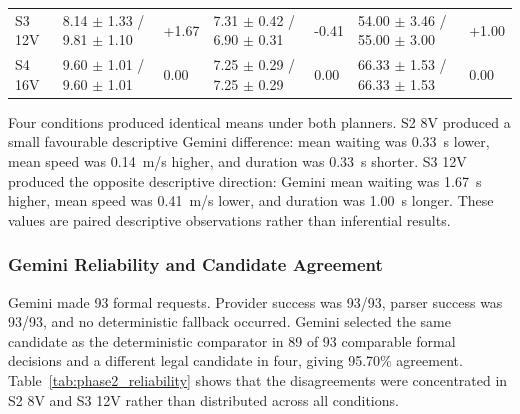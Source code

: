 \documentclass[letterpaper,10pt,conference]{ieeeconf}
\begin{document}
\begin{table}[t]
\begin{tabular}{p{1.15cm} p{2.65cm} p{0.72cm} p{2.65cm} p{0.72cm} p{2.65cm} p{0.72cm}}
S3 12V & 8.14 $\pm$ 1.33 / 9.81 $\pm$ 1.10 & +1.67 & 7.31 $\pm$ 0.42 / 6.90 $\pm$ 0.31 & -0.41 & 54.00 $\pm$ 3.46 / 55.00 $\pm$ 3.00 & +1.00 \\

S4 16V & 9.60 $\pm$ 1.01 / 9.60 $\pm$ 1.01 & 0.00 & 7.25 $\pm$ 0.29 / 7.25 $\pm$ 0.29 & 0.00 & 66.33 $\pm$ 1.53 / 66.33 $\pm$ 1.53 & 0.00 \\

\bottomrule

\end{tabular}

\end{table}



Four conditions produced identical means under both planners. S2 8V produced a small favourable descriptive Gemini difference: mean waiting was 0.33~s lower, mean speed was 0.14~m/s higher, and duration was 0.33~s shorter. S3 12V produced the opposite descriptive direction: Gemini mean waiting was 1.67~s higher, mean speed was 0.41~m/s lower, and duration was 1.00~s longer. These values are paired descriptive observations rather than inferential results.



\subsubsection{Gemini Reliability and Candidate Agreement}



Gemini made 93 formal requests. Provider success was 93/93, parser success was 93/93, and no deterministic fallback occurred. Gemini selected the same candidate as the deterministic comparator in 89 of 93 comparable formal decisions and a different legal candidate in four, giving 95.70\% agreement. Table~\ref{tab:phase2_reliability} shows that the disagreements were concentrated in S2 8V and S3 12V rather than distributed across all conditions.
\end{document}
